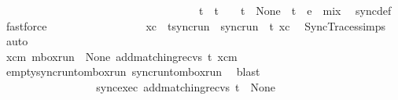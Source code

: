 \begin{isabellebody}
\isanewline
\ \ \ \ \ \ \ \ \ \ \ \ \ \ \ \ \ \ \isanewline
\ \ \ \ \ \ \ \ \ \ \ \ \ \ \isamarkupfalse%
\ \isamarkupfalse%
\ t\ \ {\isachardoublequoteopen}t\ {\isasymin}\ {\isasymL}\isactrlsub {\isasymzero}\ {\isasymand}\ t\ {\isasymin}\ {\isasymT}\isactrlbsub None\isactrlesub {\isasymdownharpoonright}\isactrlsub {\isacharbang}{\kern0pt}\ {\isasymand}\ t\ {\isacharequal}{\kern0pt}\ {\isacharparenleft}{\kern0pt}e\ {\isasymsqdot}\ {\isacharquery}{\kern0pt}mix{\isacharparenright}{\kern0pt}{\isasymdown}\isactrlsub {\isacharbang}{\kern0pt}{\isachardoublequoteclose}\ \isamarkupfalse%
\ sync{\isacharunderscore}{\kern0pt}def\ \isamarkupfalse%
\ fastforce\isanewline
\ \ \ \ \ \ \ \ \ \ \ \ \ \ \isamarkupfalse%
\ \isamarkupfalse%
\ xc\ \ t{\isacharunderscore}{\kern0pt}sync{\isacharunderscore}{\kern0pt}run\ {\isacharcolon}{\kern0pt}\ {\isachardoublequoteopen}sync{\isacharunderscore}{\kern0pt}run\ {\isasymC}\isactrlsub {\isasymI}\isactrlsub {\isasymzero}\ t\ xc{\isachardoublequoteclose}\ \isamarkupfalse%
\ SyncTraces{\isachardot}{\kern0pt}simps\ \isamarkupfalse%
\ auto\isanewline
\ \ \ \ \ \ \ \ \ \ \ \ \ \ \ \ \ \ \isanewline
\ \ \ \ \ \ \ \ \ \ \ \ \ \ \isamarkupfalse%
\ \isamarkupfalse%
\ {\isachardoublequoteopen}{\isasymexists}xcm{\isachardot}{\kern0pt}\ mbox{\isacharunderscore}{\kern0pt}run\ {\isasymC}\isactrlsub {\isasymI}\isactrlsub {\isasymmm}\ None\ {\isacharparenleft}{\kern0pt}add{\isacharunderscore}{\kern0pt}matching{\isacharunderscore}{\kern0pt}recvs\ t{\isacharparenright}{\kern0pt}\ xcm{\isachardoublequoteclose}\ \isamarkupfalse%
\ empty{\isacharunderscore}{\kern0pt}sync{\isacharunderscore}{\kern0pt}run{\isacharunderscore}{\kern0pt}to{\isacharunderscore}{\kern0pt}mbox{\isacharunderscore}{\kern0pt}run\ sync{\isacharunderscore}{\kern0pt}run{\isacharunderscore}{\kern0pt}to{\isacharunderscore}{\kern0pt}mbox{\isacharunderscore}{\kern0pt}run\ \isamarkupfalse%
\ blast\isanewline
\ \ \ \ \ \ \ \ \ \ \ \ \ \ \ \ \ \ \isanewline
\ \ \ \ \ \ \ \ \ \ \ \ \ \ \isamarkupfalse%
\ \isamarkupfalse%
\ sync{\isacharunderscore}{\kern0pt}exec{\isacharcolon}{\kern0pt}\ {\isachardoublequoteopen}{\isacharparenleft}{\kern0pt}add{\isacharunderscore}{\kern0pt}matching{\isacharunderscore}{\kern0pt}recvs\ t{\isacharparenright}{\kern0pt}\ {\isasymin}\ {\isasymT}\isactrlbsub None\isactrlesub {\isachardoublequoteclose}\ \isamarkupfalse%

\end{isabellebody}

